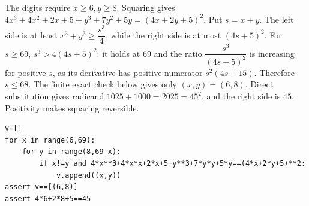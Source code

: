 The digits require $x\ge6,y\ge8$. Squaring gives $4x^3+4x^2+2x+5+y^3+7y^2+5y=(4x+2y+5)^2$. Put $s=x+y$. The left side is at least $x^3+y^3\ge\dfrac{s^3}{4}$, while the right side is at most $(4s+5)^2$. For $s\ge69$, $s^3>4(4s+5)^2$: it holds at $69$ and the ratio $\dfrac{s^3}{(4s+5)^2}$ is increasing for positive $s$, as its derivative has positive numerator $s^2(4s+15)$. Therefore $s\le68$. The finite exact check below gives only $(x,y)=(6,8)$. Direct substitution gives radicand $1025+1000=2025=45^2$, and the right side is $45$. Positivity makes squaring reversible.
\begin{verbatim}
v=[]
for x in range(6,69):
    for y in range(8,69-x):
        if x!=y and 4*x**3+4*x*x+2*x+5+y**3+7*y*y+5*y==(4*x+2*y+5)**2:
            v.append((x,y))
assert v==[(6,8)]
assert 4*6+2*8+5==45
\end{verbatim}
